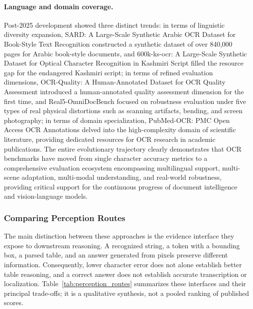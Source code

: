 \paragraph{Language and domain coverage.}
Post-2025 development showed three distinct trends: in terms of linguistic diversity expansion, SARD: A Large-Scale Synthetic Arabic OCR Dataset for Book-Style Text Recognition \cite{sard2025} constructed a synthetic dataset of over 840,000 pages for Arabic book-style documents, and 600k-ks-ocr: A Large-Scale Synthetic Dataset for Optical Character Recognition in Kashmiri Script \cite{ksocr2025} filled the resource gap for the endangered Kashmiri script; in terms of refined evaluation dimensions, OCR-Quality: A Human-Annotated Dataset for OCR Quality Assessment \cite{ocrquality2025} introduced a human-annotated quality assessment dimension for the first time, and Real5-OmniDocBench \cite{real5omni2025} focused on robustness evaluation under five types of real physical distortions such as scanning artifacts, bending, and screen photography; in terms of domain specialization, PubMed-OCR: PMC Open Access OCR Annotations \cite{pubmedocr2025} delved into the high-complexity domain of scientific literature, providing dedicated resources for OCR research in academic publications. The entire evolutionary trajectory clearly demonstrates that OCR benchmarks have moved from single character accuracy metrics to a comprehensive evaluation ecosystem encompassing multilingual support, multi-scene adaptation, multi-modal understanding, and real-world robustness, providing critical support for the continuous progress of document intelligence and vision-language models.

\subsubsection{Comparing Perception Routes}

The main distinction between these approaches is the evidence interface they expose to downstream reasoning. A recognized string, a token with a bounding box, a parsed table, and an answer generated from pixels preserve different information. Consequently, lower character error does not alone establish better table reasoning, and a correct answer does not establish accurate transcription or localization. Table~\ref{tab:perception_routes} summarizes these interfaces and their principal trade-offs; it is a qualitative synthesis, not a pooled ranking of published scores.

